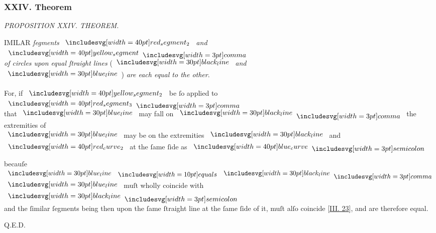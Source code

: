 \documentclass[12pt,preview]{standalone}
\begin{document}
\subsubsection{XXIV. Theorem}

\begin{minipage}[t]{0.33\textwidth}
    \vspace{40pt}
    
\end{minipage}
\hfill
\begin{minipage}[t]{0.64\textwidth}
    \vspace{0pt}

    \begin{center}
        \textit{PROPOSITION XXIV. THEOREM.}\label{book3pr24} \\
    \end{center}

    \hfill

    \begin{center}
        \raggedright \lettrine[lines=4, loversize=1, nindent=0pt]{}{}IMILAR \textit{ſegments} $\img[0][0][40]{red_segment_2}$ \textit{and} $\img[0][0][40]{yellow_segment} \bcomma$\\ \textit{of circles upon equal ſtraight lines} (\hspace{-1ex}$\blackline$ \textit{and}\\ $\blueline$\hspace{-1ex}) \textit{are each equal to the other}.
    \end{center}

    \hfill

    \hfill

    \begin{center}
        For, if $\img[0][0][40]{yellow_segment_2}$ be ſo applied to $\img[0][0][40]{red_segment_3} \bcomma$\\
        that $\blueline$ may fall on $\blackline \bcomma$ the extremities of\\
        $\blueline$ may be on the extremities $\blackline$ and\\
        $\img[0][0][40]{red_curve_2}$ at the ſame ſide as $\img[0][0][40]{blue_curve} \bsemicolon$
    \end{center}

    \hfill

    \begin{center}
        becauſe $\blueline \bequals \blackline \bcomma$\\
        $\blueline$ muſt wholly coincide with $\blackline \bsemicolon$\\
        and the ſimilar ſegments being then upon the ſame ſtraight line at the ſame ſide of it, muſt alſo coincide [\hyperref[book3pr23]{\textsc{III.} 23}], and are therefore equal.
    \end{center}

    \hfill

    \hfill Q.E.D.
\end{minipage}%
\end{document}
